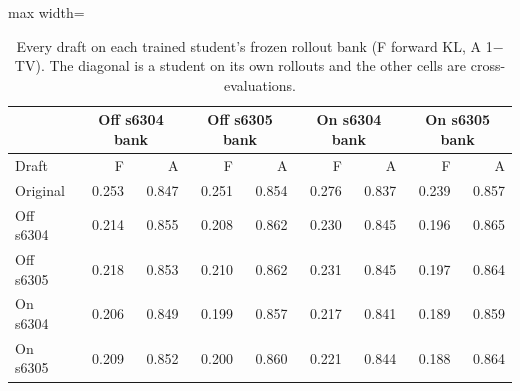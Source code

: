 \begin{table}[!htb]
\centering
\scriptsize
\setlength{\tabcolsep}{3.5pt}
\caption{Every draft on each trained student's frozen rollout bank (F forward KL, A 1$-$TV). The diagonal is a student on its own rollouts and the other cells are cross-evaluations.}
\label{tab:t3studentbanks}
\begin{adjustbox}{max width=\linewidth}
\begin{tabular}{lrrrrrrrr}
\toprule
 & \multicolumn{2}{c}{Off s6304 bank} & \multicolumn{2}{c}{Off s6305 bank} & \multicolumn{2}{c}{On s6304 bank} & \multicolumn{2}{c}{On s6305 bank} \\
\midrule
Draft & F & A & F & A & F & A & F & A \\
\midrule
Original & 0.253 & 0.847 & 0.251 & 0.854 & 0.276 & 0.837 & 0.239 & 0.857 \\
Off s6304 & 0.214 & 0.855 & 0.208 & 0.862 & 0.230 & 0.845 & 0.196 & 0.865 \\
Off s6305 & 0.218 & 0.853 & 0.210 & 0.862 & 0.231 & 0.845 & 0.197 & 0.864 \\
On s6304 & 0.206 & 0.849 & 0.199 & 0.857 & 0.217 & 0.841 & 0.189 & 0.859 \\
On s6305 & 0.209 & 0.852 & 0.200 & 0.860 & 0.221 & 0.844 & 0.188 & 0.864 \\
\bottomrule
\end{tabular}
\end{adjustbox}
\end{table}
